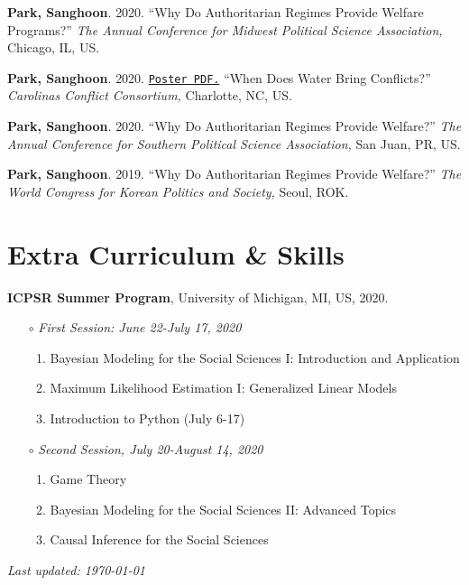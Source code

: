 \documentclass[margin,line]{res}
\begin{document}
\begin{resume}
{\bf Park, Sanghoon}. {2020.} {``Why Do Authoritarian Regimes Provide Welfare Programs?''} {\it The Annual Conference for Midwest Political Science Association,} Chicago, IL, US.

\vspace{-.25cm}
{\bf Park, Sanghoon}. {2020.} \href{https://www.dropbox.com/s/7xr90ielm1vh1sd/poster.pdf?dl=0}{\tt Poster PDF.} {``When Does Water Bring Conflicts?''} {\it Carolinas Conflict Consortium,} Charlotte, NC, US.

\vspace{-.25cm}
{\bf Park, Sanghoon}. {2020.} {``Why Do Authoritarian Regimes Provide Welfare?''} {\it The Annual Conference for Southern Political Science Association,} San Juan, PR, US.

\vspace{-.25cm}
{\bf Park, Sanghoon}. {2019.} {``Why Do Authoritarian Regimes Provide Welfare?''} {\it The World Congress for Korean Politics and Society,} Seoul, ROK.

\section{\sc Extra Curriculum \& Skills} 


{\bf ICPSR Summer Program}, University of Michigan, MI, US, 2020.

\begin{itemize} \itemsep -1mm 
	\item[$\circ$] \textit{First Session: June 22-July 17, 2020}
	\begin{enumerate} \itemsep -1mm 
		\item Bayesian Modeling for the Social Sciences I: Introduction and Application
		\item Maximum Likelihood Estimation I: Generalized Linear Models
		\item Introduction to Python (July 6-17)
	\end{enumerate}
	\item[$\circ$] \textit{Second Session, July 20-August 14, 2020}
	\begin{enumerate} \itemsep -1mm 
		\item Game Theory
		\item Bayesian Modeling for the Social Sciences II: Advanced Topics
		\item Causal Inference for the Social Sciences
	\end{enumerate}
\end{itemize}


\mbox{}
\vfill
\centering \textit{Last updated: \today}


\end{resume}
\end{document}
